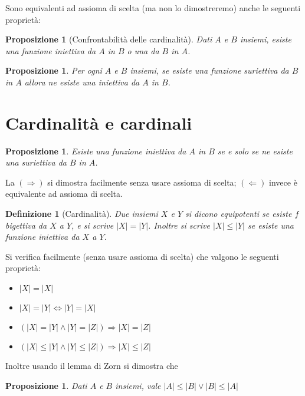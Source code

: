 \documentclass[a4paper,10pt,oneside]{article}
\newcommand{\abs}[1]{\left|#1\right|}
\theoremstyle{plain}
\newtheorem{mydef}[mytheorem]{Definizione}
\newtheorem{myprop}[mytheorem]{Proposizione}
\theoremstyle{definition}
\theoremstyle{remark}
\begin{document}
Sono equivalenti ad assioma di scelta (ma non lo dimostreremo) anche le seguenti proprietà:

\begin{myprop}[Confrontabilità delle cardinalità]
 Dati $A$ e $B$ insiemi, esiste una funzione iniettiva da $A$ in $B$ o una da $B$ in $A$.
\end{myprop}


\begin{myprop}
 Per ogni $A$ e $B$ insiemi, se esiste una funzione suriettiva da $B$ in $A$ allora ne esiste una iniettiva da $A$ in $B$.
\end{myprop}

\section{Cardinalità e cardinali}

\begin{myprop}
 Esiste una funzione iniettiva da $A$ in $B$ se e solo se ne esiste una suriettiva da $B$ in $A$.
\end{myprop}
La $(\Rightarrow)$ si dimostra facilmente senza usare assioma di scelta; $(\Leftarrow)$ invece è equivalente ad assioma di scelta.

\begin{mydef}[Cardinalità]
 Due insiemi $X$ e $Y$ si dicono equipotenti se esiste $f$ bigettiva da $X$ a $Y$, e si scrive $\abs X=\abs Y$. Inoltre si scrive $\abs X \le \abs Y$ se esiste una funzione iniettiva da $X$ a $Y$.
\end{mydef}

Si verifica facilmente (senza usare assioma di scelta) che valgono le seguenti proprietà:

\begin{itemize}
 \item $\abs X=\abs X$
 \item $\abs X=\abs Y \Leftrightarrow \abs Y=\abs X$
 \item $(\abs X=\abs Y \land \abs Y=\abs Z) \Rightarrow \abs X=\abs Z$
 \item $(\abs X \le \abs Y \land \abs Y \le \abs Z)\Rightarrow \abs X \le \abs Z$
\end{itemize}

Inoltre usando il lemma di Zorn si dimostra che

\begin{myprop}
 Dati $A$ e $B$ insiemi, vale $\abs A\le\abs B \vee \abs B\le\abs A$
\end{myprop}
\end{document}
